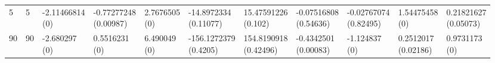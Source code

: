 \documentclass[12pt,a4paper,twoside,openany]{book}
\begin{document}
\begin{table}[ht]
{\begin{tabular}{lllllllllll}
  5 & 5 & \makecell{-2.11466814 \\ (0)} & \makecell{-0.77277248 \\ (0.00987)} & \makecell{2.7676505 \\ (0)} & \makecell{-14.8972334 \\ (0.11077)} & \makecell{15.47591226 \\ (0.102)} & \makecell{-0.07516808 \\ (0.54636)} & \makecell{-0.02767074 \\ (0.82495)} & \makecell{1.54475458 \\ (0)} & \makecell{0.21821627 \\ (0.05073)} \\ 
  90 & 90 & \makecell{-2.680297 \\ (0)} & \makecell{0.5516231 \\ (0)} & \makecell{6.490049 \\ (0)} & \makecell{-156.1272379 \\ (0.4205)} & \makecell{154.8190918 \\ (0.42496)} & \makecell{-0.4342501 \\ (0.00083)} & \makecell{-1.124837 \\ (0)} & \makecell{0.2512017 \\ (0.02186)} & \makecell{0.9731173 \\ (0)} \\ 
   \hline
\end{tabular}}
\end{table}
\end{document}
